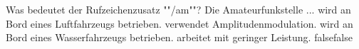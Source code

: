     {Was bedeutet der Rufzeichenzusatz ""/am""? Die Amateurfunkstelle ...}
    {wird an Bord eines Luftfahrzeugs betrieben.}
    {verwendet Amplitudenmodulation.}
    {wird an Bord eines Wasserfahrzeugs betrieben.}
    {arbeitet mit geringer Leistung.}
    {false}{false}